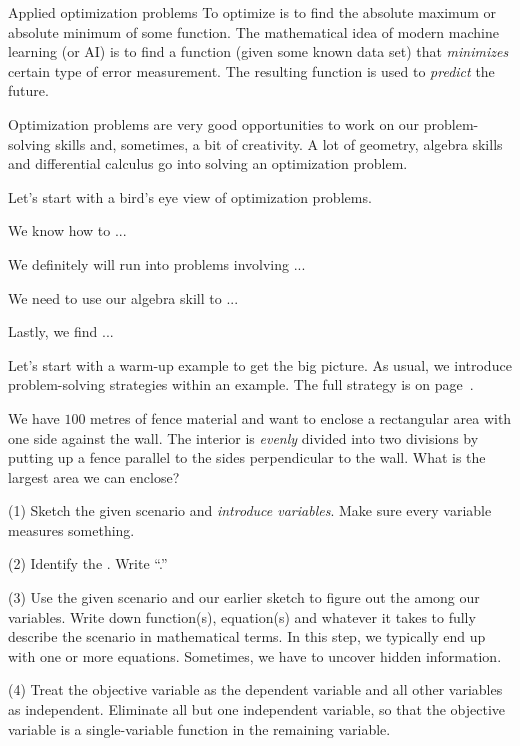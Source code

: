 \documentclass[../main.tex]{subfiles}
\begin{document}
\begin{lesson}{Applied optimization problems}
  To optimize is to find the absolute maximum or absolute minimum of some function. The mathematical idea of modern machine learning (or AI) is to find a function (given some known data set) that \emph{minimizes} certain type of error measurement. The resulting function is used to \emph{predict} the future.

  Optimization problems are very good opportunities to work on our problem-solving skills and, sometimes, a bit of creativity. A lot of geometry, algebra skills and differential calculus go into solving an optimization problem. 

  \bigskip
  Let's start with a bird's eye view of optimization problems.

  We know how to ...

  We  definitely will run into problems involving ...

  We need to use our algebra skill to ...

  Lastly, we find ...
  \clearpage

  Let's start with a warm-up example to get the big picture. As usual, we introduce problem-solving strategies within an example. The full strategy is on page~\pageref{page:optimization-strategy}.
  \begin{example} \label{ex:optimization-fence}
    We have \(100\) metres of fence material and want to enclose a rectangular area with one side against the wall. The interior is \emph{evenly} divided into two divisions by putting up a fence parallel to the sides perpendicular to the wall. What is the largest area we can enclose?

    (1) Sketch the given scenario and \emph{introduce variables}. Make sure every variable measures something.

    (2) Identify the . Write ``\emph{}.''

    (3) Use the given scenario and our earlier sketch to figure out the  among our variables. Write down function(s), equation(s) and whatever it takes to fully describe the scenario in mathematical terms. In this step, we typically end up with one or more equations. Sometimes, we have to uncover hidden information.

    (4) Treat the objective variable as the dependent variable and all other variables as independent. Eliminate all but one independent variable, so that the objective variable is a single-variable function in the remaining variable.


\end{example}
\end{lesson}
\end{document}
